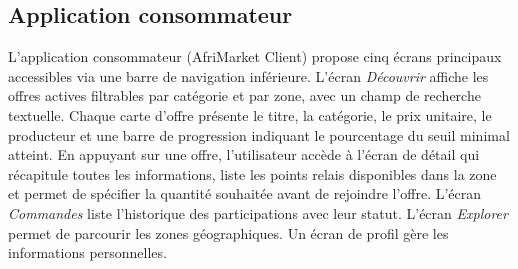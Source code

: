 \documentclass[12pt, a4paper, oneside]{report}
\begin{document}
\subsection{Application consommateur}

L'application consommateur (AfriMarket Client) propose cinq écrans principaux accessibles
via une barre de navigation inférieure. L'écran \textit{Découvrir} affiche les offres
actives filtrables par catégorie et par zone, avec un champ de recherche textuelle. Chaque
carte d'offre présente le titre, la catégorie, le prix unitaire, le producteur et une
barre de progression indiquant le pourcentage du seuil minimal atteint. En appuyant sur
une offre, l'utilisateur accède à l'écran de détail qui récapitule toutes les
informations, liste les points relais disponibles dans la zone et permet de spécifier
la quantité souhaitée avant de rejoindre l'offre. L'écran \textit{Commandes} liste
l'historique des participations avec leur statut. L'écran \textit{Explorer} permet de
parcourir les zones géographiques. Un écran de profil gère les informations personnelles.
\end{document}
